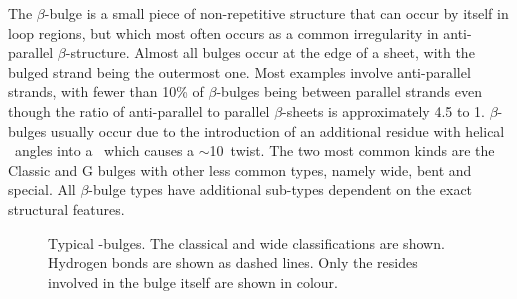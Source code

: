 The $\beta$-bulge\cite{STRUCTURE:Mil87,STRUCTURE:Mil88:Bulge,STRUCTURE:Chan1993} is a small piece of non-repetitive structure that can occur by itself in loop regions, but which most often occurs as a common irregularity in anti-parallel $\beta$-structure. Almost all bulges occur at the edge of a sheet, with the
bulged strand being the outermost one. Most examples involve anti-parallel strands, with fewer than 10\% of $\beta$-bulges being between parallel strands
even though the ratio of anti-parallel to parallel $\beta$-sheets
is approximately 4.5 to 1\cite{STRUCTURE:Chan1993}. $\beta$-bulges usually occur due to the introduction of an additional residue with helical \phipsi\ angles into a \bsheet\ which causes a $\sim$10\degree\ twist. 
The two most common kinds are the Classic and G bulges with other less common types, namely wide, bent and special. All $\beta$-bulge types have additional sub-types dependent on the
exact structural features.

\begin{figure}[hptb]
\begin{center}

\caption[Typical \be-bulges]{Typical \be-bulges. The classical and wide classifications
are shown. Hydrogen bonds are shown as dashed lines. Only the resides involved in the bulge itself are shown in colour.}
\label{fig:intro:bbulge}
\end{center}
\end{figure}

